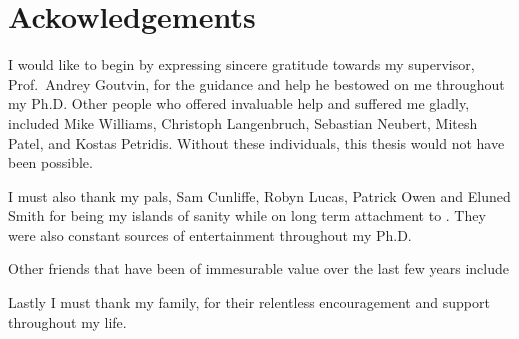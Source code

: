 \clearpage
\chapter*{\centering Ackowledgements}
\begin{center}
  {\setlength{\currentparskip}{\parskip}%
  \begin{minipage}{0.8\textwidth}
    \setlength{\parskip}{\currentparskip}%
    I would like to begin by expressing sincere gratitude towards my supervisor, Prof.~Andrey Goutvin,
    for the guidance and help he bestowed on me throughout my Ph.D.
    Other people who offered invaluable help and suffered me gladly, included
    Mike Williams,
    Christoph Langenbruch,
    Sebastian Neubert,
    Mitesh Patel, and
    Kostas Petridis.
    Without these individuals, this thesis would not have been possible.

    I must also thank my pals, Sam Cunliffe, Robyn Lucas, Patrick Owen and Eluned Smith for being
    my islands of sanity while on long
    term attachment to \cern.
    They were also constant sources of entertainment throughout my Ph.D.

    Other friends that have been of immesurable value over the last few years include

    Lastly I must thank my family, for their relentless encouragement and support throughout my
    life.

  \end{minipage}}
\end{center}



